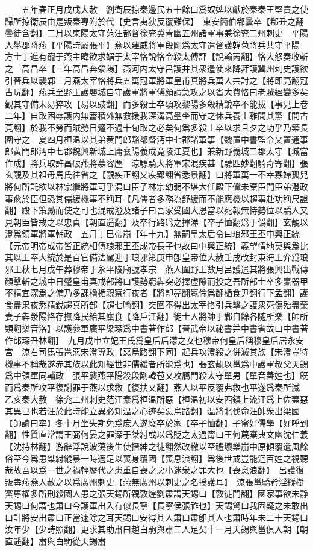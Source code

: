 　　五年春正月戊戌大赦　劉衛辰掠秦邊民五十餘口爲奴婢以獻於秦秦王堅責之使歸所掠衛辰由是叛秦專附於代【史言夷狄反覆難保】　東安簡伯郗曇卒【郗丑之翻曇徒含翻】二月以東陽太守范汪都督徐兖冀青幽五州諸軍事兼徐兖二州刺史　平陽人舉郡降燕【平陽時屬張平】燕以建威將軍段剛爲太守遣督護韓苞將兵共守平陽　方士丁進有寵于燕主暐欲求媚于太宰恪說恪令殺太傅評【說輸芮翻】恪大怒奏收斬之　高昌卒【三年高昌奔滎陽】燕河内太守呂護并其衆遣使來降拜護冀州刺史護欲引晉兵以襲鄴三月燕太宰恪將兵五萬冠軍將軍皇甫真將兵萬人共討之【將即亮翻冠古玩翻】燕兵至野王護嬰城自守護軍將軍傅顔請急攻之以省大費恪曰老賊經變多矣觀其守備未易猝攻【易以豉翻】而多殺士卒頃攻黎陽多殺精銳卒不能拔【事見上卷二年】自取困辱護内無蓄積外無救援我深溝高壘坐而守之休兵養士離間其黨【間古莧翻】於我不勞而賊勢日蹙不過十旬取之必矣何爲多殺士卒以求且夕之功乎乃築長圍守之　夏四月桓温以其弟黄門郎豁都督沔中七郡諸軍事【魏置中書監令又置通事郎黄門郎沔中七郡魏興新城上庸襄陽義成竟陵江夏也】兼新野義城二郡太守【城當作成】將兵取許昌破燕將慕容塵　涼驃騎大將軍宋混疾甚【驃匹妙翻騎奇寄翻】張玄靚及其祖母馬氏往省之【靚疾正翻又疾郢翻省悉景翻】曰將軍萬一不幸寡婦孤兒將何所託欲以林宗繼將軍可乎混曰臣子林宗幼弱不堪大任殿下儻未棄臣門臣弟澄政事愈於臣但恐其儒緩機事不稱耳【凡儒者多務為舒緩而不能應機以趨事赴功稱尺證翻】殿下策勵而使之可也混戒澄及諸子曰吾家受國大恩當以死報無恃勢位以驕人又見朝臣皆戒之以忠貞【朝直遥翻】及卒行路爲之揮涕【卒子恤翻爲于僞翻】玄靚以澄爲領軍將軍輔政　五月丁巳帝崩【年十九】無嗣皇太后令曰琅邪王丕中興正統【元帝明帝成帝皆正統相傳琅邪王丕成帝長子也故曰中興正統】義望情地莫與爲比其以王奉大統於是百官備法駕迎于琅邪第庚申卽皇帝位大赦壬戌改封東海王弈爲琅邪王秋七月戊午葬穆帝于永平陵廟號孝宗　燕人圍野王數月呂護遣其將張興出戰傳顔擊斬之城中日蹙皇甫真戒部將曰護勢窮犇突必擇虛隙而投之吾所部士卒多羸器甲不精宜深爲之備乃多課櫓楯親察行夜者【將卽亮翻羸倫爲翻楯食尹翻行下孟翻】護食盡果夜悉精銳趨真所部【趨七喻翻】突圍不得出太宰恪引兵擊之護衆死傷殆盡棄妻子犇滎陽恪存撫降民給其廩食【降戶江翻】徙士人將帥于鄴自餘各随所樂【帥所類翻樂音洛】以護參軍廣平梁琛爲中書著作郎【晉武帝以祕書并中書省故曰中書著作郎琛丑林翻】　九月戊申立妃王氏爲皇后后濛之女也穆帝何皇后稱穆皇后居永安宫　涼右司馬張邕惡宋澄專政【惡烏路翻下同】起兵攻澄殺之併滅其族【宋澄豈特機事不稱哉遂赤其族以此知經世非儒緩者所能爲也】張玄靚以邕爲中護軍叔父天錫爲中領軍同輔政　張平襲燕平陽殺段剛韓苞又攻鴈門殺太守單男【單音善姓也】旣而爲秦所攻平復謝罪于燕以求救【復扶又翻】燕人以平反覆弗救也平遂爲秦所滅　乙亥秦大赦　徐兖二州刺史范汪素爲桓温所惡【桓温初以安西鎮上流汪爲上佐蓋惡其異已也若汪於此時能立異必知温之心迹矣惡烏路翻】温將北伐命汪帥衆出梁國【帥讀曰率】冬十月坐失期免爲庶人遂廢卒於家【卒子恤翻】子甯好儒學【好呼到翻】性質直常謂王弼何晏之罪深于桀紂或以爲貶之太過甯曰王何蔑棄典文幽沈仁義【沈持林翻】游辭浮說波蕩後生使搢紳之徒翻然改轍以至禮壞樂崩中原傾覆遺風餘俗至今爲患桀紂縱暴一時適足以喪身覆國【喪息浪翻】爲後世戒豈能迴百姓之視聽哉故吾以爲一世之禍輕歷代之患重自喪之惡小迷衆之罪大也【喪息浪翻】　呂護復叛犇燕燕人赦之以爲廣州刺史【燕無廣州以刺史之名授護耳】　涼張邕驕矜淫縱樹黨專權多所刑殺國人患之張天錫所親敦煌劉肅謂天錫曰【敦徒門翻】國家事欲未静天錫曰何謂也肅曰今護軍出入有似長寧【長寧侯張祚也】天錫驚曰我固疑之未敢出口計將安出肅曰正當速除之耳天錫曰安得其人肅曰肅卽其人也肅時年未二十天錫曰汝年少【少詩照翻】更求其助肅曰趙白駒與肅二人足矣十一月天錫與邕俱入朝【朝直遥翻】肅與白駒從天錫肅